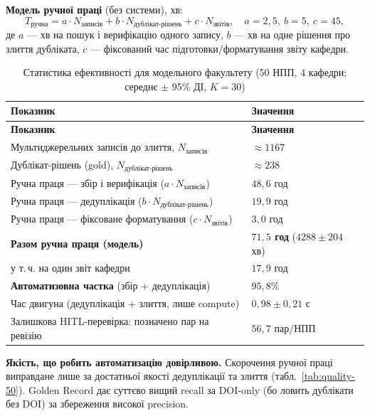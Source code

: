 \textbf{Модель ручної праці} (без системи), хв:
\begin{equation}
T_{\text{ручна}} = a\cdot N_{\text{записів}} + b\cdot N_{\text{дублікат-рішень}} + c\cdot N_{\text{звітів}},\quad a=2{,}5,\ b=5,\ c=45,
\end{equation}
де $a$ --- хв на пошук і верифікацію одного запису, $b$ --- хв на одне рішення про злиття дубліката, $c$ --- фіксований час підготовки/форматування звіту кафедри.

\begin{longtable}{@{}p{}p{}@{}}
\caption{Статистика ефективності для модельного факультету (50 НПП, 4 кафедри; середнє $\pm$ 95\% ДІ, $K=30$)}\label{tab:efficiency-50}\\
\toprule
\textbf{Показник} & \textbf{Значення} \\
\midrule
\endfirsthead
\toprule
\textbf{Показник} & \textbf{Значення} \\
\midrule
\endhead
Мультиджерельних записів до злиття, $N_{\text{записів}}$ & $\approx 1167$ \\
Дублікат-рішень (gold), $N_{\text{дублікат-рішень}}$ & $\approx 238$ \\
\midrule
Ручна праця --- збір і верифікація ($a\cdot N_{\text{записів}}$) & $48{,}6$ год \\
Ручна праця --- дедуплікація ($b\cdot N_{\text{дублікат-рішень}}$) & $19{,}9$ год \\
Ручна праця --- фіксоване форматування ($c\cdot N_{\text{звітів}}$) & $3{,}0$ год \\
\textbf{Разом ручна праця (модель)} & \textbf{$71{,}5$ год} ($4288\pm204$ хв) \\
\quad у т.\,ч. на один звіт кафедри & $17{,}9$ год \\
\midrule
\textbf{Автоматизовна частка} (збір + дедуплікація) & \textbf{$95{,}8\%$} \\
Час двигуна (дедуплікація + злиття, лише compute) & $0{,}98\pm0{,}21$ с \\
Залишкова HITL-перевірка: позначено пар на ревізію & $56{,}7$ пар/НПП \\
\bottomrule
\end{longtable}

\textbf{Якість, що робить автоматизацію довірливою.} Скорочення ручної праці виправдане лише за достатньої якості дедуплікації та злиття (табл.~\ref{tab:quality-50}). Golden Record дає суттєво вищий recall за DOI-only (бо ловить дублікати без DOI) за збереження високої precision.


